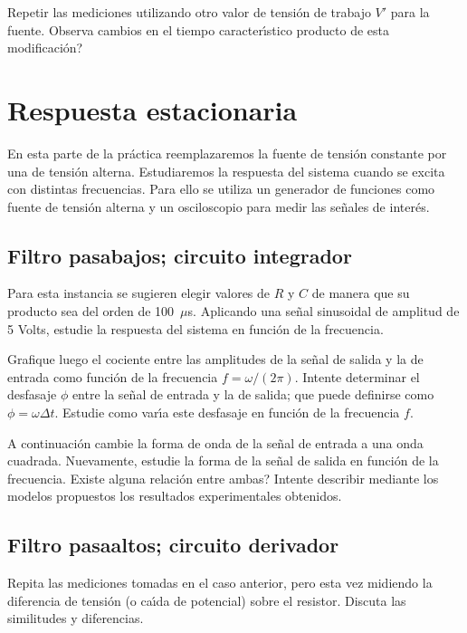 \documentclass[laboratorio]{guia}
\begin{document}
Repetir las mediciones utilizando otro valor de tensi\'on de trabajo $V'$
para la fuente. Observa cambios en el tiempo caracter\'\i stico producto de
esta modificaci\'on?

\section{Respuesta estacionaria}

En esta parte de la pr\'actica reemplazaremos la fuente de tensi\'on 
constante por una de tensi\'on alterna. Estudiaremos la respuesta del sistema
cuando se excita con distintas frecuencias. Para ello se utiliza un generador
de funciones como fuente de tensi\'on alterna y un osciloscopio para medir
las se\~nales de inter\'es. 

\subsection{Filtro pasabajos; circuito integrador}

Para esta instancia se sugieren elegir valores de $R$ y $C$ de manera que 
su producto sea del orden de 100~$\mu$s. Aplicando una se\~nal sinusoidal de
amplitud de 5 Volts, estudie la respuesta del sistema en funci\'on de la
frecuencia. 

Grafique luego el cociente entre las amplitudes de la se\~nal de salida y
la de entrada como funci\'on de la frecuencia $f = \omega/(2\pi)$. Intente 
determinar el desfasaje $\phi$ entre la se\~nal de entrada y la de salida; que 
puede definirse como $\phi = \omega \Delta t$. Estudie como var\'\i a este 
desfasaje en funci\'on de la frecuencia $f$. 

A continuaci\'on cambie la forma de onda de la se\~nal de entrada a una 
onda cuadrada. Nuevamente, estudie la forma de la se\~nal de salida en 
funci\'on de la frecuencia. Existe alguna relaci\'on entre ambas? Intente
describir mediante los modelos propuestos los resultados experimentales 
obtenidos. 

\subsection{Filtro pasaaltos; circuito derivador}

Repita las mediciones tomadas en el caso anterior, pero esta vez midiendo 
la diferencia de tensi\'on (o ca\'\i da de potencial) sobre el resistor. 
Discuta las similitudes y diferencias. 

\nocite{Alonso1998,Purcell1988,Reitz1996,Trelles1984,Reitz1996}
 

\end{document}
